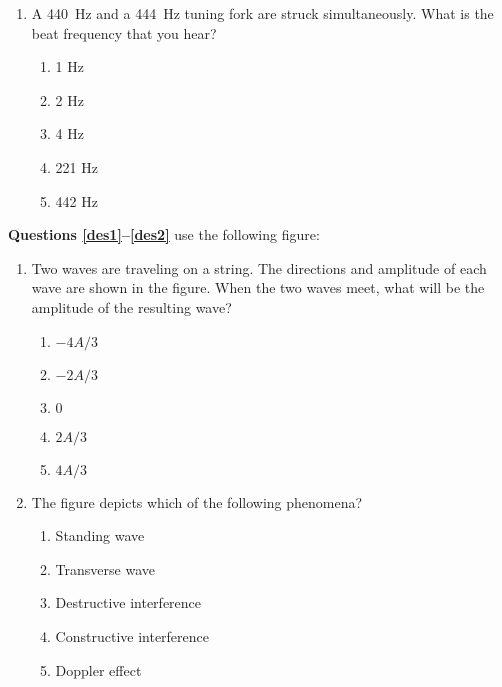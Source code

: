 \documentclass{../../../oss-classkick}
\begin{document}
\begin{multicols}{2}
\begin{enumerate}[leftmargin=18pt]
  \item A \SI{440}{\hertz} and a \SI{444}{\hertz} tuning fork are struck
    simultaneously. What is the beat frequency that you hear?
    \begin{enumerate}[nosep,leftmargin=18pt,label=(\Alph*)]
    \item 1 Hz
    \item 2 Hz
    \item 4 Hz
    \item 221 Hz
    \item 442 Hz
    \end{enumerate}
  \end{enumerate}
  \columnbreak
  
  \textbf{Questions \ref{des1}--\ref{des2}} use the following figure:
  \begin{center}
  \end{center}
  \begin{enumerate}[leftmargin=18pt,resume]
  \item Two waves are traveling on a string. The directions and amplitude of
    each wave are shown in the figure. When the two waves meet, what
    will be the amplitude of the resulting wave?
    \label{des1}
    \begin{enumerate}[nosep,leftmargin=18pt,label=(\Alph*)]
    \item $-4A/3$
    \item $-2A/3$
    \item $0$
    \item $2A/3$
    \item $4A/3$
    \end{enumerate}
    
  \item The figure depicts which of the following phenomena?
    \begin{enumerate}[nosep,leftmargin=18pt,label=(\Alph*)]
    \item Standing wave
    \item Transverse wave
    \item Destructive interference
    \item Constructive interference
    \item Doppler effect
    \end{enumerate}
    \vspace{.7in}
    

\end{enumerate}
\end{multicols}
\end{document}
